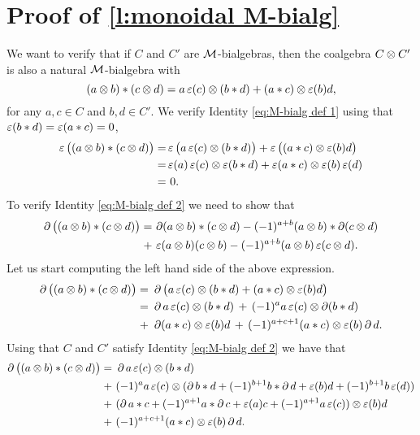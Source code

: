 
\newcommand{\sk}[1]{\\ #1\ &}
\newcommand{\bdast}[2]{\bd #1 \ast #2 + (-1)^{#1+1} #1 \ast \bd #2 + \aug(#1) #2 + (-1)^{#1+1} #1 \aug(#2)}
\appendix
\section{Proof of \cref{l:monoidal M-bialg}}\label{s:appendix}

We want to verify that if $C$ and $C'$ are $\mathcal{M}$-bialgebras, then the coalgebra $C \otimes C'$ is also a natural $\mathcal{M}$-bialgebra with
\begin{equation*}
	(a \otimes b) \ast (c \otimes d) =
	a \operatorname{\varepsilon}(c) \otimes (b \ast d) + (a \ast c) \otimes \operatorname{\varepsilon}(b) d,
\end{equation*}
for any $a,c \in C$ and $b,d \in C'$.
We verify Identity \eqref{eq:M-bialg def 1} using that $\operatorname{\varepsilon}(b \ast d) = \operatorname{\varepsilon}(a \ast c) = 0$,
\begin{align*}
	\operatorname{\varepsilon}\big((a \otimes b) \ast (c \otimes d)\big) =&
	\operatorname{\varepsilon}\big(a \operatorname{\varepsilon}(c) \otimes (b \ast d)\big) + \operatorname{\varepsilon}\big((a \ast c) \otimes \operatorname{\varepsilon}(b) d\big) \\ =&
	\operatorname{\varepsilon}(a) \operatorname{\varepsilon}(c) \otimes \operatorname{\varepsilon}(b \ast d) + \operatorname{\varepsilon}(a \ast c) \otimes \operatorname{\varepsilon}(b) \operatorname{\varepsilon}(d) \\ =& \ 0.
\end{align*}
To verify Identity \eqref{eq:M-bialg def 2} we need to show that
\begin{equation}\label{eq:monoidal appendix}
	\begin{split}
		\operatorname{\partial} \big((a \otimes b) \ast (c \otimes d)\big) =\, &
		\operatorname{\partial} (a \otimes b) \ast (c \otimes d) - (-1)^{a+b} (a \otimes b) \ast \operatorname{\partial} (c \otimes d) \\ +\, &
		\operatorname{\varepsilon}(a \otimes b) (c \otimes b) - (-1)^{a+b} (a \otimes b) \operatorname{\varepsilon}(c \otimes d).
	\end{split}
\end{equation}
Let us start computing the left hand side of the above expression.
\begin{align*}
	\bd\big((a \ot b) \ast (c \ot d)\big) =\ &
	\bd\big(a \aug(c) \ot (b \ast d) + (a \ast c) \ot \aug(b) d\big) \sk{=}
	\bd a \aug(c) \ot (b \ast d) \,+\, (-1)^{a} a \aug(c) \ot \bd(b \ast d) \sk{+}
	\bd (a \ast c) \ot \aug(b) d \,+\, (-1)^{a+c+1} (a \ast c) \ot \aug(b) \bd d.
\end{align*}
Using that $C$ and $C'$ satisfy Identity \eqref{eq:M-bialg def 2} we have that
\begin{align*}
	\bd\big((a \ot b) \ast (c \ot d)\big) =\ &
	\bd a \aug(c) \ot (b \ast d) \sk{+}
	(-1)^a a \aug(c) \ot (\bdast{b}{d}) \sk{+}
	(\bdast{a}{c}) \ot \aug(b) d \sk{+}
	(-1)^{a+c+1} (a \ast c) \ot \aug(b) \bd d.
\end{align*}
